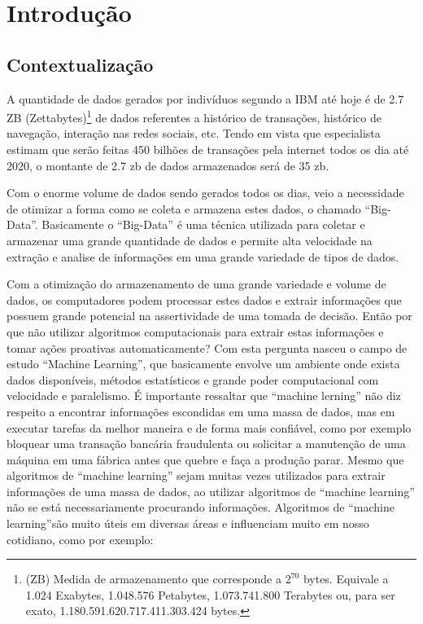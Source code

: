 \chapter{Introdução}
\label{cap:introducao}

\section{Contextualização}
\label{sec:contextualizacao}
	A quantidade de dados gerados por indivíduos segundo a IBM até hoje é de 2.7 ZB (Zettabytes)\footnote{(ZB) Medida de armazenamento que corresponde a $2^{70}$ bytes. Equivale a 1.024 Exabytes,
1.048.576 Petabytes, 1.073.741.800 Terabytes ou, para ser exato, 1.180.591.620.717.411.303.424 bytes.} de dados referentes a histórico de transações, histórico de navegação, interação nas redes sociais, etc. Tendo em vista que especialista estimam que serão feitas 450 bilhões de transações pela internet todos os dia até 2020, o montante de 2.7 zb de dados armazenados será de 35 zb.

	Com o enorme volume de dados sendo gerados todos os dias, veio a necessidade de otimizar a forma como se coleta e armazena estes dados, o chamado “Big-Data”. Basicamente o “Big-Data” é uma técnica utilizada para coletar e armazenar uma grande quantidade de dados e permite alta velocidade na extração e analise de informações em uma grande variedade de tipos de dados. 

	Com a otimização do armazenamento de uma grande variedade e volume de dados, os computadores podem processar estes dados e extrair informações que possuem grande potencial na assertividade de uma tomada de decisão. Então por que não utilizar algoritmos computacionais para extrair estas informações e tomar ações proativas automaticamente? Com esta pergunta nasceu o campo de estudo “Machine Learning”, que basicamente envolve um ambiente onde exista dados disponíveis, métodos estatísticos e grande poder computacional com velocidade e paralelismo. 
	É importante ressaltar que “machine lerning” não diz respeito a encontrar informações escondidas em uma massa de dados, mas em executar tarefas da melhor maneira e de forma mais confiável, como por exemplo bloquear uma transação bancária fraudulenta ou solicitar a manutenção de uma máquina em uma fábrica antes que quebre e faça a produção parar. Mesmo que algoritmos de “machine learning” sejam muitas vezes utilizados para extrair informações de uma massa de dados, ao utilizar algoritmos de “machine learning” não se está necessariamente procurando informações. Algoritmos de “machine learning”são muito úteis em diversas áreas e influenciam muito em nosso cotidiano, como por exemplo:

